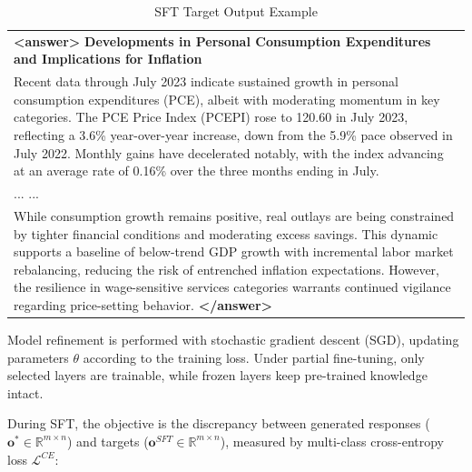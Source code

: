 \begin{table}[h]
\begin{tabular}{p{}}
    \textbf{\textless answer\textgreater} \textbf{Developments in Personal Consumption Expenditures and Implications for Inflation} \\

    Recent data through July 2023 indicate sustained growth in personal consumption expenditures (PCE), albeit with moderating momentum in key categories. The PCE Price Index (PCEPI) rose to 120.60 in July 2023, reflecting a 3.6\% year-over-year increase, down from the 5.9\% pace observed in July 2022. Monthly gains have decelerated notably, with the index advancing at an average rate of 0.16\% over the three months ending in July. \\

    ... ... \\

    While consumption growth remains positive, real outlays are being constrained by tighter financial conditions and moderating excess savings. This dynamic supports a baseline of below-trend GDP growth with incremental labor market rebalancing, reducing the risk of entrenched inflation expectations. However, the resilience in wage-sensitive services categories warrants continued vigilance regarding price-setting behavior. \textbf{\textless /answer\textgreater} \\
    \bottomrule
    \end{tabular}
    \caption{SFT Target Output Example}
    \label{tab:ch2:sft_target_output_example}
\end{table}


Model refinement is performed with stochastic gradient descent (SGD), updating parameters $\theta$ according to the training loss. Under partial fine-tuning, only selected layers are trainable, while frozen layers keep pre-trained knowledge intact.

During SFT, the objective is the discrepancy between generated responses ($\bm{o^*}\in\mathbb{R}^{m\times n}$) and targets ($\bm{o}^{SFT}\in\mathbb{R}^{m\times n}$), measured by multi-class cross-entropy loss $\mathcal{L}^{CE}$:


